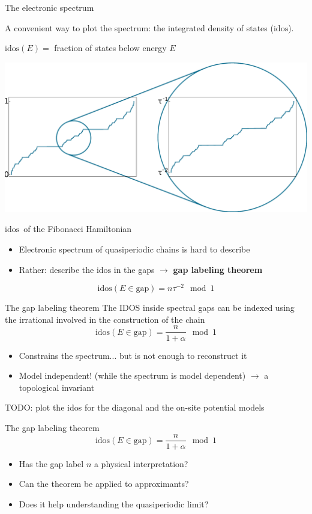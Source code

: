 \documentclass[xcolor=x11names,compress,professionalfonts]{beamer}
\renewcommand{\(}{\begin{columns}}
\renewcommand{\)}{\end{columns}}
\newcommand{\<}[1]{\begin{column}{#1}}
\renewcommand{\>}{\end{column}}
\newcommand{\id}{\ensuremath{\text{idos}}}
\begin{document}
\begin{frame}{The electronic spectrum}

A convenient way to plot the spectrum: the integrated density of states ($\id$).

$\id(E) = $ fraction of states below energy $E$

{\centering
\includegraphics[scale=.35]{img/idos_scaling.pdf}

\small{\id~of the Fibonacci Hamiltonian}

}

\begin{itemize}
	\item Electronic spectrum of quasiperiodic chains is hard to describe
	\item Rather: describe the $\id$ in the gaps $\to$ \textbf{gap labeling theorem}
\end{itemize}
\[
	\id(E\in \text{gap}) = n \tau^{-2} \mod 1
\]

\end{frame}

\begin{frame}{The gap labeling theorem}
The IDOS inside spectral gaps can be indexed using the irrational involved in the construction of the chain
	\[
		\id(E \in \text{gap}) = \frac{n}{1+\alpha} \mod 1
	\]
\begin{itemize}
	\item Constrains the spectrum... but is not enough to reconstruct it
	\item Model independent! (while the spectrum is model dependent) $\to$ a topological invariant
\end{itemize}

TODO: plot the idos for the diagonal and the on-site potential models

\end{frame}

\begin{frame}{The gap labeling theorem}
\[
		\id(E \in \text{gap}) = \frac{n}{1+\alpha} \mod 1
	\]
\begin{itemize}
	\item Has the gap label $n$ a physical interpretation?
\end{itemize}
\begin{itemize}
	\item Can the theorem be applied to approximants? 
	\item Does it help understanding the quasiperiodic limit?
\end{itemize}

\end{frame}
\end{document}
